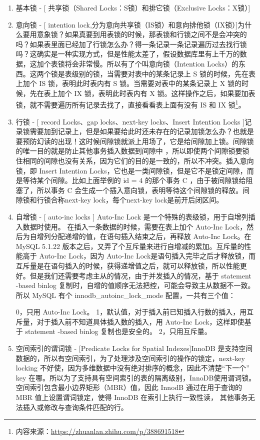\documentclass[../../../interview-questions.tex]{subfiles}
\begin{document}
\begin{enumerate}
    \item{基本锁 - [ 共享锁（Shared Locks：S锁）和排它锁（Exclusive Locks：X锁）]}
    \item{意向锁 - [ intention lock,分为意向共享锁（IS锁）和意向排他锁（IX锁）]}为什么要用意象锁？如果真要到用表锁的时候，那表锁和行锁之间不是会冲突的吗？如果表里面已经加了行锁怎么办？得一条记录一条记录遍历过去找行锁吗？这确实是一种实现方式，但是性能太差了，假设数据库里有上千万的数据，这加个表锁将会非常慢。所以有了个叫意向锁（Intention Locks）的东西。这两个锁是表级别的锁，当需要对表中的某条记录上 S 锁的时候，先在表上加个 IS 锁，表明此时表内有 S 锁。当需要对表中的某条记录上 X 锁的时候，先在表上加个 IX 锁，表明此时表内有 X 锁。这样操作之后，如果要加表锁，就不需要遍历所有记录去找了，直接看看表上面有没有 IS 和 IX 锁\footnote{内容来源：\url{https://zhuanlan.zhihu.com/p/388691518}}。
    \item{行锁 - [ record Locks、gap locks、next-key locks、Insert Intention Locks ]}记录锁需要加到记录上，但是如果要给此时还未存在的记录加锁怎么办？也就是要预防幻读的出现！这时候间隙锁就派上用场了，它是给间隙加上锁。间隙锁的唯一目的就是防止其他事务插入数据到间隙中 ，所以即使两个间隙锁要锁住相同的间隙也没有关系，因为它们的目的是一致的，所以不冲突。插入意向锁，即 Insert Intention Locks，它也是一类间隙锁，但是它不是锁定间隙，而是等待某个间隙。比如上面举例的 id = 4 的那个事务 C ，由于被间隙锁给阻塞了，所以事务 C 会生成一个插入意向锁，表明等待这个间隙锁的释放。间隙锁和行锁合称next-key lock，每个next-key lock是前开后闭区间。
    \item{自增锁 - [ auto-inc locks ] }Auto-Inc Lock 是一个特殊的表级锁，用于自增列插入数据时使用。 在插入一条数据的时候，需要在表上加个 Auto-Inc Lock，然后为自增列分配递增的值，在语句插入结束之后，再释放 Auto-Inc Lock。在 MySQL 5.1.22 版本之后，又弄了个互斥量来进行自增减的累加。互斥量的性能高于 Auto-Inc Lock，因为 Auto-Inc Lock是语句插入完毕之后才释放锁，而互斥量是在语句插入的时候，获得递增值之后，就可以释放锁，所以性能更好。但是我们还需要考虑主从的情况，由于并发插入的情况，基于 statement -based binlog 复制时，自增的值顺序无法把控，可能会导致主从数据不一致。所以 MySQL 有个 innodb\_autoinc\_lock\_mode 配置，一共有三个值：
    
    0，只用 Auto-Inc Lock。
    1，默认值，对于插入前已知插入行数的插入，用互斥量，对于插入前不知道具体插入数的插入，用 Auto-Inc Lock，这样即使基于 statement -based binlog 复制也是安全的。
    2，只用互斥量。
    \item {空间索引的谓词锁 - [Predicate Locks for Spatial Indexes]}InnoDB 是支持空间数据的，所以有空间索引，为了处理涉及空间索引的操作的锁定，next-key locking 不好使，因为多维数据中没有绝对排序的概念，因此不清楚“下一个” key 在哪。所以为了支持具有空间索引的表的隔离级别，InnoDB使用谓词锁。空间索引包含最小边界矩形（MBR）值，因此 InnodB 通过在用于查询的 MBR 值上设置谓词锁定，使得 InnoDB 在索引上执行一致性读， 其他事务无法插入或修改与查询条件匹配的行。
\end{enumerate}
\end{document}

